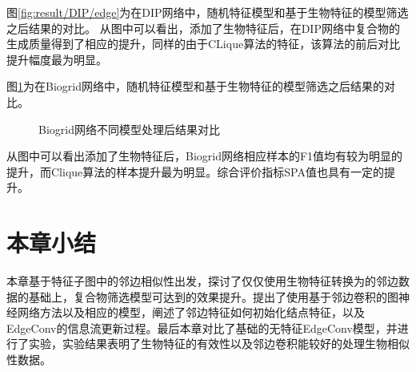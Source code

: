 图\ref{fig:result/DIP/edge}为在DIP网络中，随机特征模型和基于生物特征的模型筛选之后结果的对比。
从图中可以看出，添加了生物特征后，在DIP网络中复合物的生成质量得到了相应的提升，同样的由于CLique算法的特征，该算法的前后对比提升幅度最为明显。

图\ref{fig:result/Biogrid/edge}为在Biogrid网络中，随机特征模型和基于生物特征的模型筛选之后结果的对比。
\begin{figure}[htbp]
    \centering
    \vskip0.2cm
    \caption{Biogrid网络不同模型处理后结果对比}
    \label{fig:result/Biogrid/edge}
\end{figure}
从图中可以看出添加了生物特征后，Biogrid网络相应样本的F1值均有较为明显的提升，而Clique算法的样本提升最为明显。综合评价指标SPA值也具有一定的提升。

\section{本章小结}
\label{section:EdgeConv:summary}

本章基于特征子图中的邻边相似性出发，探讨了仅仅使用生物特征转换为的邻边数据的基础上，复合物筛选模型可达到的效果提升。提出了使用基于邻边卷积的图神经网络方法以及相应的模型，阐述了邻边特征如何初始化结点特征，以及EdgeConv的信息流更新过程。最后本章对比了基础的无特征EdgeConv模型，并进行了实验，实验结果表明了生物特征的有效性以及邻边卷积能较好的处理生物相似性数据。